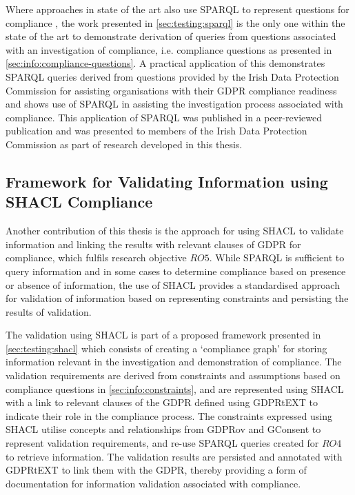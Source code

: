 Where approaches in state of the art also use SPARQL to represent questions for compliance \cite{agarwal_legislative_2018,palmirani_pronto_2018}, the work presented in \autoref{sec:testing:sparql} is the only one within the state of the art to demonstrate derivation of queries from questions associated with an investigation of compliance, i.e. compliance questions as presented in \autoref{sec:info:compliance-questions}.
A practical application of this demonstrates SPARQL queries derived from questions provided by the Irish Data Protection Commission for assisting organisations with their GDPR compliance readiness \cite{GDPR_readiness_checklist} and shows use of SPARQL in assisting the investigation process associated with compliance.
This application of SPARQL was published in a peer-reviewed publication \cite{pandit_queryable_2018} and was presented to members of the Irish Data Protection Commission as part of research developed in this thesis.

\subsection{Framework for Validating Information using SHACL Compliance}\label{sec:contributions:validation}
Another contribution of this thesis is the approach for using SHACL to validate information and linking the results with relevant clauses of GDPR for compliance, which fulfils research objective $RO5$.
While SPARQL is sufficient to query information and in some cases to determine compliance based on presence or absence of information, the use of SHACL provides a standardised approach for validation of information based on representing constraints and persisting the results of validation.

The validation using SHACL is part of a proposed framework presented in \autoref{sec:testing:shacl} which consists of creating a `compliance graph' for storing information relevant in the investigation and demonstration of compliance.
The validation requirements are derived from constraints and assumptions based on compliance questions in \autoref{sec:info:constraints}, and are represented using SHACL with a link to relevant clauses of the GDPR defined using GDPRtEXT to indicate their role in the compliance process.
The constraints expressed using SHACL utilise concepts and relationships from GDPRov and GConsent to represent validation requirements, and re-use SPARQL queries created for $RO4$ to retrieve information.
The validation results are persisted and annotated with GDPRtEXT to link them with the GDPR, thereby providing a form of documentation for information validation associated with compliance.


